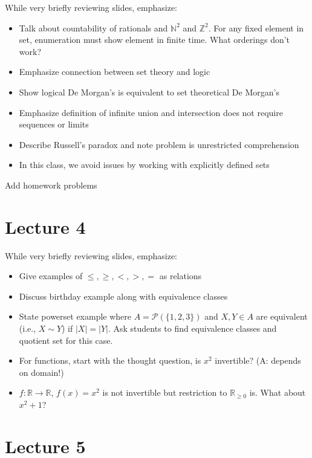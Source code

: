 \documentclass[10pt,english]{article}
\begin{document}
While very briefly reviewing slides,  emphasize:
\begin{itemize}
  \item Talk about countability of rationals and $\mathbb{N}^2$ and $\mathbb{Z}^2$.  For any fixed element in set, enumeration must show element in finite time.  What orderings don't work?
  \item Emphasize connection between set theory and logic
  \item Show logical De Morgan's is equivalent to set theoretical De Morgan's
  \item Emphasize definition of infinite union and intersection does not require sequences or limits
  \item Describe Russell's paradox and note problem is unrestricted comprehension
  \item In this class, we avoid issues by working with explicitly defined sets
\end{itemize}
Add homework problems


\section*{Lecture 4}

While very briefly reviewing slides,  emphasize:
\begin{itemize}
  \item Give examples of $\leq,\geq,<,>,=$ as relations
  \item Discuss birthday example along with equivalence classes
  \item State powerset example where $A = \mathcal{P}(\{1,2,3\})$ and $X,Y \in A$ are equivalent (i.e., $X\sim Y$) if $|X|=|Y|$.
  Ask students to find equivalence classes and quotient set for this case. 
  \item For functions, start with the thought question, is $x^2$ invertible? (A: depends on domain!)
  \item $f:\mathbb{R} \to \mathbb{R}$, $f(x)=x^2$ is not invertible but restriction to $\mathbb{R}_{\geq 0}$ is.
  What about $x^2 + 1$?
\end{itemize}

\section*{Lecture 5}
\end{document}
